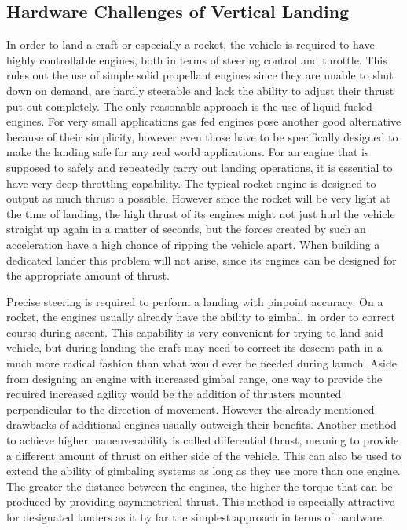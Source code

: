 
\subsection{Hardware Challenges of Vertical Landing}

In order to land a craft or especially a rocket, the vehicle is required to have highly controllable engines, both in terms of steering control and throttle. This rules out the use of simple solid propellant engines since they are unable to shut down on demand, are hardly steerable and lack the ability to adjust their thrust put out completely. The only reasonable approach is the use of liquid fueled engines. For very small applications gas fed engines pose another good alternative because of their simplicity, however even those have to be specifically designed to make the landing safe for any real world applications. For an engine that is supposed to safely and repeatedly carry out landing operations, it is essential to have very deep throttling capability. The typical rocket engine is designed to output as much thrust a possible. However since the rocket will be very light at the time of landing, the high thrust of its engines might not just hurl the vehicle straight up again in a matter of seconds, but the forces created by such an acceleration have a high chance of ripping the vehicle apart. When building a dedicated lander this problem will not arise, since its engines can be designed for the appropriate amount of thrust.

Precise steering is required to perform a landing with pinpoint accuracy. On a rocket, the engines usually already have the ability to gimbal, in order to correct course during ascent. This capability is very convenient for trying to land said vehicle, but during landing the craft may need to correct its descent path in a much more radical fashion than what would ever be needed during launch. Aside from designing an engine with increased gimbal range, one way to provide the required increased agility would be the addition of thrusters mounted perpendicular to the direction of movement. However the already mentioned drawbacks of additional engines usually outweigh their benefits. Another method to achieve higher maneuverability is called differential thrust, meaning to provide a different amount of thrust on either side of the vehicle. This can also be used to extend the ability of gimbaling systems as long as they use more than one engine. The greater the distance between the engines, the higher the torque that can be produced by providing asymmetrical thrust. This method is especially attractive for designated landers as it by far the simplest approach in terms of hardware.

